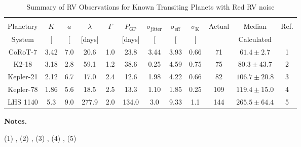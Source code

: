 \begin{table*}
  \small
  \renewcommand{\arraystretch}{0.7}
  \caption{Summary of RV Observations for Known Transiting Planets with Red RV noise}
  \label{RVFCtable:compare_red}
  \begin{tabular}{cccccccccccc}
    \hline \\ [-1ex]
    Planetary & $K$ & $a$ & $\lambda$ & $\Gamma$ & $P_{\text{GP}}$ & $\sigma_{\text{jitter}}$ & $\sigma_{\text{eff}}$ & $\sigma_{\text{K}} $ & Actual & Median & Ref. \\
    System & [\mps{]} & [\mps{]} & [days] & & [days] & [\mps{]} & [\mps{]} & [\mps{]} & \nrv{} & Calculated \nrv{} \\
    \hline
    CoRoT-7 & 3.42 & 7.0 & 20.6 & 1.0 & 23.8 & 3.44 & 3.93 & 0.66 & 71 & $61.4 \pm 2.7$ & 1 \\
    K2-18 & 3.18 & 2.8 & 59.1 & 1.2 & 38.6 & 0.25 & 4.59 & 0.75 & 75 & $80.3 \pm 43.7$ & 2 \\
    Kepler-21 & 2.12 & 6.7 & 17.0 & 2.4 & 12.6 & 1.98 & 4.22 & 0.66 & 82 & $106.7 \pm 20.8$ & 3\\
    Kepler-78 & 1.86 & 5.6 & 18.5 & 2.5 & 13.3 & 1.10 & 1.85 & 0.25 & 109 & $119.4 \pm 15.0$ & 4\\
    LHS 1140 & 5.3 & 9.0 & 277.9 & 2.0 & 134.0 & 3.0 & 9.33 & 1.1 & 144 & $265.5 \pm 64.4$ & 5
  \end{tabular}
  \begin{list}{}{}
  \item {\bf{Notes.}}
  \item (1) \cite{haywood14}, (2) \cite{cloutier17b}, (3) \cite{lopezmorales16}, (4) \cite{grunblatt15}, (5) \cite{dittmann17a}
  \end{list}  
\end{table*}
